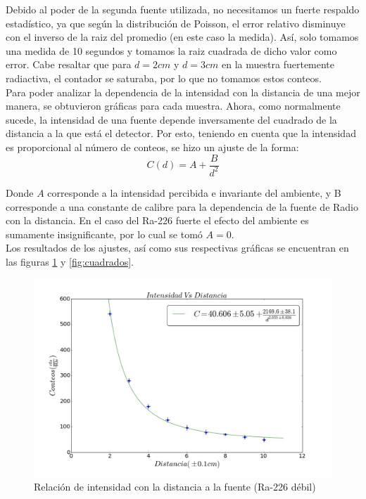 \documentclass[%
 reprint,
 amsmath,amssymb,
 aps,
]{revtex4-1}
\begin{document}
Debido al poder de la segunda fuente utilizada, no necesitamos un fuerte respaldo estadístico, ya que según la distribución de Poisson, el error relativo disminuye con el inverso de la raiz del promedio (en este caso la medida). Así, solo tomamos una medida de 10 segundos y tomamos la raiz cuadrada de dicho valor como error. Cabe resaltar que para $d= 2cm$ y $d = 3cm$ en la muestra fuertemente radiactiva, el contador se saturaba, por lo que no tomamos estos conteos.\\

Para poder analizar la dependencia de la intensidad con la distancia de una mejor manera, se obtuvieron gráficas para cada muestra. Ahora, como normalmente sucede, la intensidad de una fuente depende inversamente del cuadrado de la distancia a la que está el detector. Por esto, teniendo en cuenta que la intensidad es proporcional al número de conteos, se hizo un ajuste de la forma:\\

\begin{equation}
 	C(d) = A + \frac{B}{d^2}
\end{equation}

Donde $A$ corresponde a la intensidad percibida e invariante del ambiente, y B corresponde a una constante de calibre  para la dependencia de la fuente de Radio con la distancia. En el caso del Ra-226 fuerte el efecto del ambiente es sumamente insignificante, por lo cual se tomó $A = 0$.\\

Los resultados de los ajustes, así como sus respectivas gráficas se encuentran en las figuras \ref{fig:distancia} y \ref{fig:cuadrados}.\\

\begin{figure}[h!]
\centering
\includegraphics[width=1.1\linewidth]{distancia.jpg}
\caption{Relación de intensidad con la distancia a la fuente (Ra-226 débil)}
\label{fig:distancia}
\end{figure}
\end{document}
